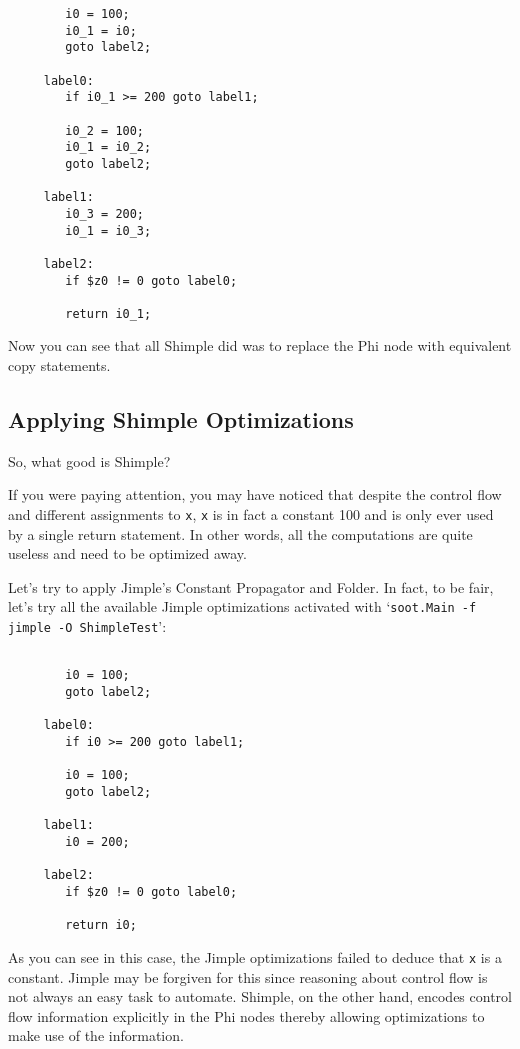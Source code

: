 \documentclass[10pt,letterpaper,oneside,onecolumn]{article}
\begin{document}
\begin{verbatim}
        i0 = 100;
        i0_1 = i0;
        goto label2;

     label0:
        if i0_1 >= 200 goto label1;

        i0_2 = 100;
        i0_1 = i0_2;
        goto label2;

     label1:
        i0_3 = 200;
        i0_1 = i0_3;

     label2:
        if $z0 != 0 goto label0;

        return i0_1;
\end{verbatim}

Now you can see that all Shimple did was to replace the Phi node
with equivalent copy statements.

\subsection{Applying Shimple Optimizations}

So, what good is Shimple?  

If you were paying attention, you may have noticed that despite the
control flow and different assignments to {\tt x}, {\tt x} is in fact
a constant 100 and is only ever used by a single return statement.  In
other words, all the computations are quite useless and need to be
optimized away.

Let's try to apply Jimple's Constant Propagator and Folder.  In fact,
to be fair, let's try all the available  Jimple optimizations activated
with `{\tt soot.Main -f jimple -O ShimpleTest}':

\begin{verbatim}

        i0 = 100;
        goto label2;

     label0:
        if i0 >= 200 goto label1;

        i0 = 100;
        goto label2;

     label1:
        i0 = 200;

     label2:
        if $z0 != 0 goto label0;

        return i0;
\end{verbatim}

As you can see in this case, the Jimple optimizations failed to deduce
that {\tt x} is a constant.  Jimple may be forgiven for this since
reasoning about control flow is not always an easy task to automate.
Shimple, on the other hand, encodes control flow information
explicitly in the Phi nodes thereby allowing optimizations to make use
of the information.
\end{document}
